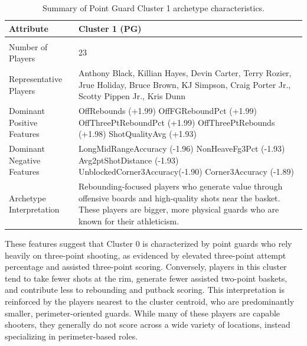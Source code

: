\documentclass{article}
\begin{document}
\begin{table}[t]
\centering
\small
\caption{Summary of Point Guard Cluster 1 archetype characteristics.}
\label{tab:pg_cluster1}
\begin{tabular}{p{2cm} p{4.5cm}}
\hline
\textbf{Attribute} & \textbf{Cluster 1 (PG)} \\ 
\hline \\

Number of Players & 23 \\

Representative Players &   Anthony Black, Killian Hayes, Devin Carter, Terry Rozier, Jrue Holiday, 
Bruce Brown, KJ Simpson, Craig Porter Jr., Scotty Pippen Jr., Kris Dunn \\

Dominant Positive Features &  OffRebounds                 (+1.99) \newline
OffFGReboundPct             (+1.99) \newline
OffThreePtReboundPct        (+1.99)\newline
OffThreePtRebounds          (+1.98) \newline
ShotQualityAvg              (+1.93) \newline \\

Dominant Negative Features &  LongMidRangeAccuracy       (-1.96) \newline
NonHeaveFg3Pct             (-1.93) \newline 
Avg2ptShotDistance         (-1.93) \newline
UnblockedCorner3Accuracy(-1.90) \newline
Corner3Accuracy            (-1.89) \newline \\

Archetype Interpretation & Rebounding-focused players who generate value through offensive boards and 
high-quality shots near the basket. These players are bigger, more physical guards who are known 
for their athleticism. \\ 

\hline
\end{tabular}
\end{table}

These features suggest that Cluster 0 is characterized by point guards who rely heavily on 
three-point shooting, as evidenced by elevated three-point attempt percentage and assisted 
three-point scoring. Conversely, players in this cluster tend to take fewer shots at the rim, 
generate fewer assisted two-point baskets, and contribute less to rebounding and putback scoring. 
This interpretation is reinforced by the players nearest to the cluster centroid, who are 
predominantly smaller, perimeter-oriented guards. While many of these players are capable shooters, 
they generally do not score across a wide variety of locations, instead specializing in 
perimeter-based roles.
\end{document}
